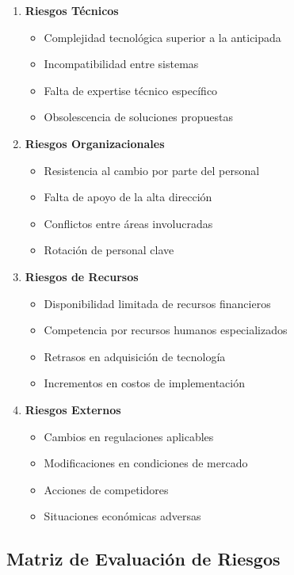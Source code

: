 \documentclass[12pt,letterpaper,oneside]{book}
\begin{document}
\begin{enumerate}
\item \textbf{Riesgos Técnicos}
   \begin{itemize}
   \item Complejidad tecnológica superior a la anticipada
   \item Incompatibilidad entre sistemas
   \item Falta de expertise técnico específico
   \item Obsolescencia de soluciones propuestas
   \end{itemize}

\item \textbf{Riesgos Organizacionales}
   \begin{itemize}
   \item Resistencia al cambio por parte del personal
   \item Falta de apoyo de la alta dirección
   \item Conflictos entre áreas involucradas
   \item Rotación de personal clave
   \end{itemize}

\item \textbf{Riesgos de Recursos}
   \begin{itemize}
   \item Disponibilidad limitada de recursos financieros
   \item Competencia por recursos humanos especializados
   \item Retrasos en adquisición de tecnología
   \item Incrementos en costos de implementación
   \end{itemize}

\item \textbf{Riesgos Externos}
   \begin{itemize}
   \item Cambios en regulaciones aplicables
   \item Modificaciones en condiciones de mercado
   \item Acciones de competidores
   \item Situaciones económicas adversas
   \end{itemize}
\end{enumerate}

\subsection{Matriz de Evaluación de Riesgos}
\end{document}
